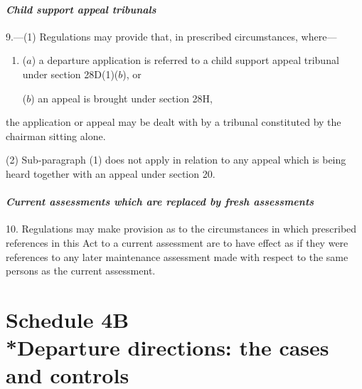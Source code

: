 \documentclass[12pt,a4paper]{article}
\begin{document}

\subsection*{\itshape 
Child support appeal tribunals
}

9.---(1) Regulations may provide that, in prescribed circumstances, where—
\begin{enumerate}\item[]
($a$) a departure application is referred to 
a child support appeal tribunal 
under section 28D(1)($b$), or

($b$) an appeal is brought under section 28H,
\end{enumerate}
the application or appeal may be dealt with by a tribunal constituted by the chairman sitting alone.

(2) Sub-paragraph (1) does not apply in relation to any appeal which is being heard together with an appeal under section 20.


\subsection*{\itshape Current assessments which are replaced by fresh assessments}

10. Regulations may make provision as to the circumstances in which prescribed references in this Act to a current assessment are to have effect as if they were references to any later maintenance assessment made with respect to the same persons as the current assessment.

\part[Schedule 4B --- Departure directions: the cases and controls]{Schedule 4B\\*Departure directions: the cases and controls}

\end{document}
